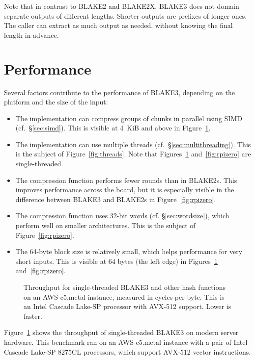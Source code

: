 \documentclass[11pt,notitlepage,a4paper]{article}
\begin{document}
Note that in contrast to BLAKE2 and BLAKE2X, BLAKE3 does not domain separate
outputs of different lengths. Shorter outputs are prefixes of longer ones. The
caller can extract as much output as needed, without knowing the final length
in advance.

\section{Performance}\label{sec:performance}

Several factors contribute to the performance of BLAKE3, depending on the
platform and the size of the input:

\begin{itemize}
    \item The implementation can compress groups of chunks in parallel using
        SIMD (cf.~\S\ref{sec:simd}). This is visible at 4~KiB and above in
        Figure~\ref{fig:avx512}.
    \item The implementation can use multiple threads
        (cf.~\S\ref{sec:multithreading}). This is the subject of
        Figure~\ref{fig:threads}. Note that Figures~\ref{fig:avx512}
        and~\ref{fig:rpizero} are single-threaded.
    \item The compression function performs fewer rounds than in BLAKE2s. This
        improves performance across the board, but it is especially visible in
        the difference between BLAKE3 and BLAKE2s in Figure~\ref{fig:rpizero}.
    \item The compression function uses 32-bit words (cf.
        \S\ref{sec:wordsize}), which perform well on smaller architectures.
        This is the subject of Figure~\ref{fig:rpizero}.
    \item The 64-byte block size is relatively small, which helps performance
        for very short inputs. This is visible at 64 bytes (the left edge) in
        Figures~\ref{fig:avx512} and~\ref{fig:rpizero}.
\end{itemize}

\begin{figure}[h]
\centering

\caption{Throughput for single-threaded BLAKE3 and other hash functions on an
    AWS c5.metal instance, measured in cycles per byte. This is an Intel
    Cascade Lake-SP processor with AVX-512 support. Lower is faster.}%
\label{fig:avx512}
\end{figure}

Figure~\ref{fig:avx512} shows the throughput of single-threaded BLAKE3 on
modern server hardware. This benchmark ran on an AWS c5.metal instance with a
pair of Intel Cascade Lake-SP 8275CL processors, which support AVX-512 vector
instructions.
\end{document}
